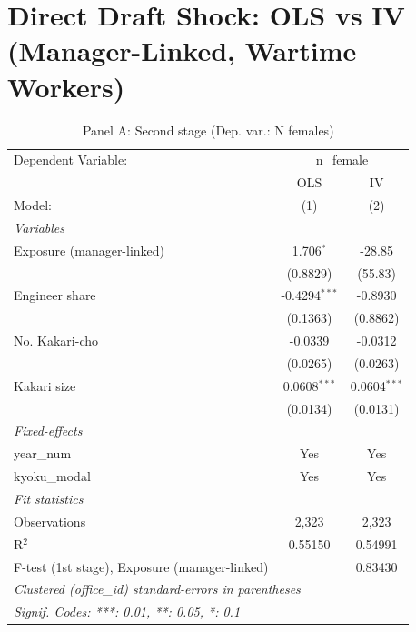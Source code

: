 \documentclass[11pt]{article}
\begin{document}
\section*{Direct Draft Shock: OLS vs IV (Manager-Linked, Wartime Workers)}
\vspace{0.5em}
\begin{table}[htbp]
   \caption{\label{tab:panel_a} Panel A: Second stage (Dep. var.: N females)}
   \centering
   \begin{tabular}{lcc}
      \tabularnewline \midrule \midrule
      Dependent Variable: & \multicolumn{2}{c}{n\_female}\\
                                                    & OLS             & IV \\   
      Model:                                        & (1)             & (2)\\  
      \midrule
      \emph{Variables}\\
      Exposure (manager-linked)                     & 1.706$^{*}$     & -28.85\\   
                                                    & (0.8829)        & (55.83)\\   
      Engineer share                                & -0.4294$^{***}$ & -0.8930\\   
                                                    & (0.1363)        & (0.8862)\\   
      No. Kakari-cho                                & -0.0339         & -0.0312\\   
                                                    & (0.0265)        & (0.0263)\\   
      Kakari size                                   & 0.0608$^{***}$  & 0.0604$^{***}$\\   
                                                    & (0.0134)        & (0.0131)\\   
      \midrule
      \emph{Fixed-effects}\\
      year\_num                                     & Yes             & Yes\\  
      kyoku\_modal                                  & Yes             & Yes\\  
      \midrule
      \emph{Fit statistics}\\
      Observations                                  & 2,323           & 2,323\\  
      R$^2$                                         & 0.55150         & 0.54991\\  
      F-test (1st stage), Exposure (manager-linked) &                 & 0.83430\\  
      \midrule \midrule
      \multicolumn{3}{l}{\emph{Clustered (office\_id) standard-errors in parentheses}}\\
      \multicolumn{3}{l}{\emph{Signif. Codes: ***: 0.01, **: 0.05, *: 0.1}}\\
   \end{tabular}
\end{table}
\end{document}
